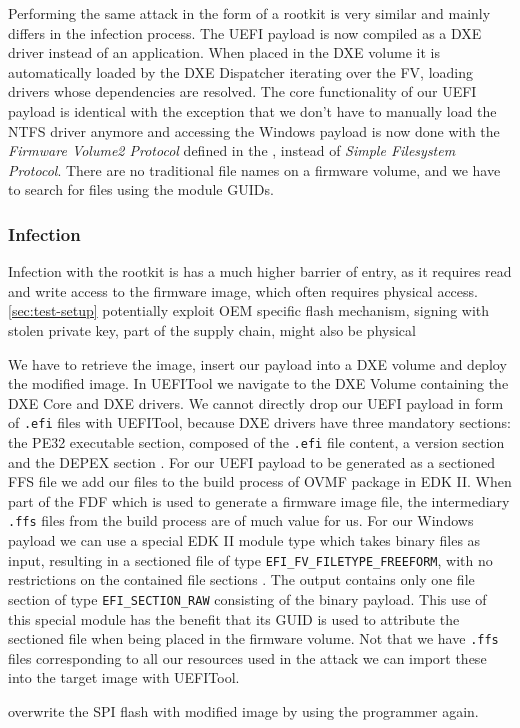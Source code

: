 Performing the same attack in the form of a rootkit is very similar and mainly differs in the infection process.
The \ac{UEFI} payload is now compiled as a \ac{DXE} driver instead of an application.
When placed in the \ac{DXE} volume it is automatically loaded by the \ac{DXE} Dispatcher iterating over the \ac{FV}, loading  drivers whose dependencies are resolved.
The core functionality of our \ac{UEFI} payload is identical with the exception that we don't have to manually load the \ac{NTFS} driver anymore and accessing the Windows payload is now done with the \emph{Firmware Volume2 Protocol} defined in the \cite[Section 3.4.1]{pi-spec}, instead of \emph{Simple Filesystem Protocol}. There are no traditional file names on a firmware volume, and we have to search for files using the module \acp{GUID}.

\subsubsection{Infection}

Infection with the rootkit is has a much higher barrier of entry, as it requires read and write access to the firmware image, which often requires physical access.
\autoref{sec:test-setup} potentially exploit \ac{OEM} specific flash mechanism, signing with stolen private key, part of the supply chain, might also be physical 

We have to retrieve the image, insert our payload into a \ac{DXE} volume and deploy the modified image.
In UEFITool we navigate to the \ac{DXE} Volume containing the \ac{DXE} Core and \ac{DXE} drivers.
We cannot directly drop our \ac{UEFI} payload in form of \lstinline{.efi} files with UEFITool, because \ac{DXE} drivers have three mandatory sections: the \ac{PE32} executable section, composed of the \lstinline{.efi} file content, a version section and the \ac{DEPEX} section \cite[Vol. 3, 2.1.4.1.4]{pi-spec}.
For our \ac{UEFI} payload to be generated as a sectioned \ac{FFS} file we add our files to the build process of \ac{OVMF} package in \ac{EDK} II. When part of the \ac{FDF} which is used to generate a firmware image file, the intermediary \lstinline{.ffs} files from the build process are of much value for us.
For our Windows payload we can use a special \ac{EDK} II module type which takes binary files as input, resulting in a sectioned file of type \lstinline{EFI_FV_FILETYPE_FREEFORM}, with no restrictions on the contained file sections \cite[Vol. 3, 2.1.4.1.7]{pi-spec}.
The output contains only one file section of type \lstinline{EFI_SECTION_RAW} consisting of the binary payload.
This use of this special module has the benefit that its \ac{GUID} is used to attribute the sectioned file when being placed in the firmware volume.
Not that we have \lstinline{.ffs} files corresponding to all our resources used in the attack we can import these into the target image with UEFITool.

overwrite the SPI flash with modified image by using the programmer again.

\clearpage
